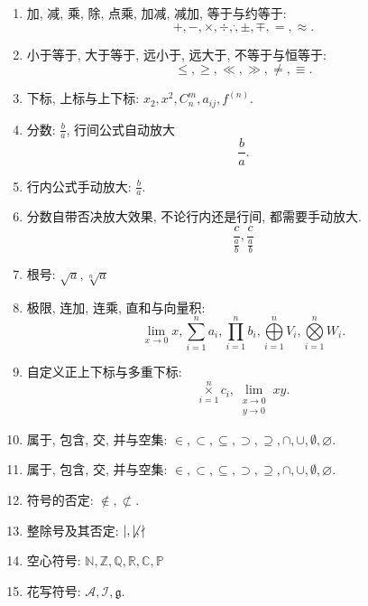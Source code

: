 \documentclass[a4paper, 11pt, UTF8]{article}
\theoremstyle{plain}
\theoremstyle{definition}
\theoremstyle{remark}
\begin{document}
	\begin{enumerate}
		\item 加, 减, 乘, 除, 点乘, 加减, 减加, 等于与约等于:
		$$+,-,\times,\div,\dot,\pm,\mp,=,\approx.$$
		
		\item 小于等于, 大于等于, 远小于, 远大于, 不等于与恒等于:
		$$\le,\ge,\ll,\gg,\ne,\equiv.$$
		
		\item 下标, 上标与上下标: $ x_2,x^2,C_n^m,a_{ij},f^{(n)} $.
		
		\item 分数: $ \frac{b}{a} $, 行间公式自动放大
		$$\frac{b}{a}.$$
		
		\item 行内公式手动放大: $ \displaystyle\frac{b}{a} $.
		
		\item 分数自带否决放大效果, 不论行内还是行间, 都需要手动放大.
		$$\frac{c}{\frac{a}{b}}, \frac{c}{\displaystyle\frac{a}{b}}$$
		
		\item 根号: $ \sqrt{a},\sqrt[n]{a} $
		
		\item 极限, 连加, 连乘, 直和与向量积:
		$$\lim\limits_{x \rightarrow 0} x, \sum\limits_{i=1}^n a_i, \prod\limits_{i=1}^{n} b_i, \bigoplus\limits_{i=1}^n V_i, \bigotimes\limits_{i=1}^n W_i.$$
		
		\item 自定义正上下标与多重下标:
		$$\mathop{\times}\limits_{i=1}^n c_i,\lim\limits_{\substack{x\rightarrow 0 \\ y \rightarrow 0}} xy.$$
		
		\item 属于, 包含, 交, 并与空集: $ \in, \subset, \subseteq, \supset, \supseteq, \cap, \cup, \emptyset, \varnothing $.
		
		\item 属于, 包含, 交, 并与空集: $ \in, \subset, \subseteq, 
		\supset, \supseteq, \cap, \cup, \emptyset, \varnothing $.
		
		\item 符号的否定: $ \not\in, \not\subset $.
		
		\item 整除号及其否定: $ \mid, \not\mid, \nmid $
		
		\item  空心符号: $ \mathbb{N}, \mathbb{Z}, \mathbb{Q}, \mathbb{R}, \mathbb{C}, \mathbb{P} $
		
		\item 花写符号: $ \mathcal{A}, \mathcal{I}, \mathfrak{g} $.
		

\end{enumerate}
\end{document}
